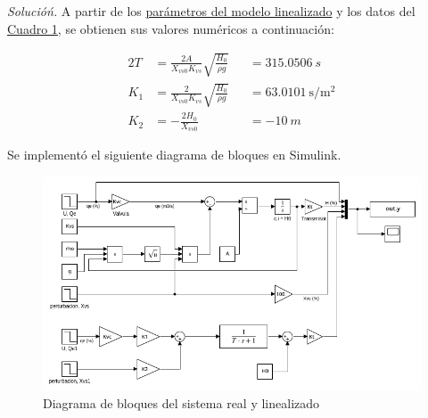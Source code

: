
\textit{Solucióń.} A partir de los \hyperref[eq3]{parámetros del modelo linealizado} y los datos del \hyperref[t1]{Cuadro 1}, se obtienen sus valores numéricos a continuación:

\begin{alignat*}{2}
    T &= \frac{2A}{X _{vs0} K _{vs}} \sqrt{ \frac{H_0}{\rho g}} &&= \SI{315.0506}{s}\\
    K _{1} &= \frac{2}{X _{vs0} K _{vs}} \sqrt{ \frac{H_0}{\rho g}} &&= \SI{63.0101}{\second\per\metre\squared}\\
    K _{2} &= - \frac{2 H_0}{X _{vs0}} &&= \SI{-10}{m}
\end{alignat*}

\newpage

Se implementó el siguiente diagrama de bloques en Simulink.

\begin{figure}[!h]
    \centering
    \includegraphics[width = 0.8\linewidth]{figs/fig3.png}
    \caption{Diagrama de bloques del sistema real y linealizado}
    \label{fig3}
\end{figure}


